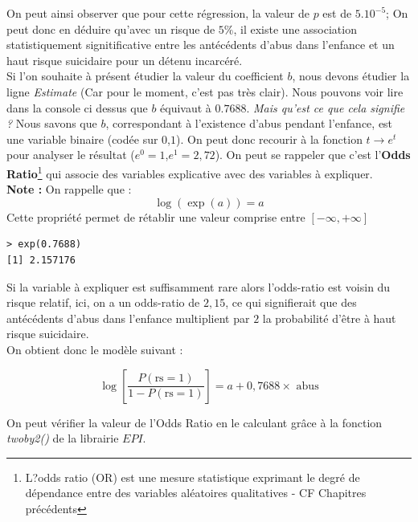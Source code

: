 On peut ainsi observer que pour cette régression, la valeur de $p$ est de $5.10^{-5}$; On peut donc en déduire qu'avec un risque de $5\%$, il existe une association statistiquement signitificative entre les antécédents d'abus dans l'enfance et un haut risque suicidaire pour un détenu incarcéré.\newline
\\
Si l'on souhaite à présent étudier la valeur du coefficient $b$, nous devons étudier la ligne \textit{Estimate} (Car pour le moment, c'est pas très clair). Nous pouvons voir lire dans la console ci dessus que $b$ équivaut à $0.7688$. \textit{Mais qu'est ce que cela signifie ?}\newline
Nous savons que $b$, correspondant à l'existence d'abus pendant l'enfance, est une variable binaire (codée sur $0$,$1$). On peut donc recourir à la fonction $t \longrightarrow e^{t}$ pour analyser le résultat ($e^{0} = 1$,$ e^{1}= 2,72$). On peut se rappeler que c'est l'\textbf{Odds Ratio}\footnote{L?odds ratio (OR) est une mesure statistique exprimant le degré de dépendance entre des variables aléatoires qualitatives - CF Chapitres précédents} qui associe des variables explicative avec des variables à expliquer.\newline
\\
\textbf{Note : } On rappelle que :
$$\log(\exp(a))=a$$
Cette propriété permet de rétablir une valeur comprise entre $[-\infty,+\infty]$

\begin{lstlisting}[language=html]
> exp(0.7688)
[1] 2.157176
\end{lstlisting}

Si la variable à expliquer est suffisamment rare alors l'odds-ratio est voisin du risque relatif, ici, on a un odds-ratio de $2,15$, ce qui signifierait que des antécédents d'abus dans l'enfance multiplient par $2$ la probabilité d'être à haut risque suicidaire.\newline
\\
On obtient donc le modèle suivant : 

$$\log\left[\frac{P(\textrm{rs} = 1)}{1-P(\textrm{rs} = 1)}\right] = a + 0,7688 \times\textrm{ abus}$$

On peut vérifier la valeur de l'Odds Ratio en le calculant grâce à la fonction \textit{twoby2()} de la librairie $EPI$.

